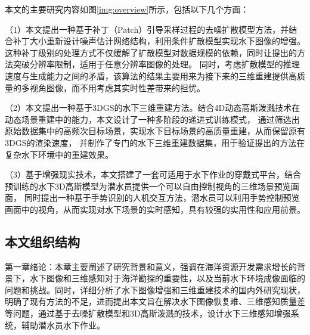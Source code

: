 本文的主要研究内容如图\ref{img:overview}所示，包括以下几个方面：

（1）本文提出一种基于补丁（Patch）引导采样过程的去噪扩散模型方法，并结合补丁大小重新设计噪声估计网络结构，利用条件扩散模型实现水下图像的增强。
这种补丁级别的处理方式不仅缓解了扩散模型对数据规模的依赖，同时让提出的方法突破分辨率限制，适用于任意分辨率图像的处理。
同时，考虑扩散模型的推理速度与生成能力之间的矛盾，该算法的结果主要用来为接下来的三维重建提供高质量的多视角图像，而不用考虑其实时性差带来的担忧。

（2）本文提出一种基于3DGS的水下三维重建方法。结合4D动态高斯泼溅技术在动态场景重建中的能力，本文设计了一种多阶段的递进式训练模式，
通过筛选出原始数据集中的高频次目标场景，实现水下目标场景的高质量重建，从而保留原有3DGS的渲染速度，
并制作了专门的水下三维重建数据集，用于验证提出的方法在复杂水下环境中的重建效果。

（3）基于增强现实技术，本文搭建了一套可适用于水下作业的穿戴式平台，结合预训练的水下3D高斯模型为潜水员提供一个可以自由控制视角的三维场景预览画面，
同时提出一种基于手势识别的人机交互方法，潜水员可以利用手势控制预览画面中的视角，从而实现对水下场景的实时感知，具有较强的实用性和应用前景。




\subsection{本文组织结构}
第一章绪论：本章主要阐述了研究背景和意义，强调在海洋资源开发需求增长的背景下，水下图像和三维感知对于海洋勘探的重要性，以及当前水下环境成像面临的问题和挑战。同时，详细分析了水下图像增强和三维重建技术的国内外研究现状，明确了现有方法的不足，进而提出本文旨在解决水下图像恢复难、三维感知质量差等问题，通过基于去噪扩散模型和3D高斯泼溅的技术，设计水下三维感知增强系统，辅助潜水员水下作业。

